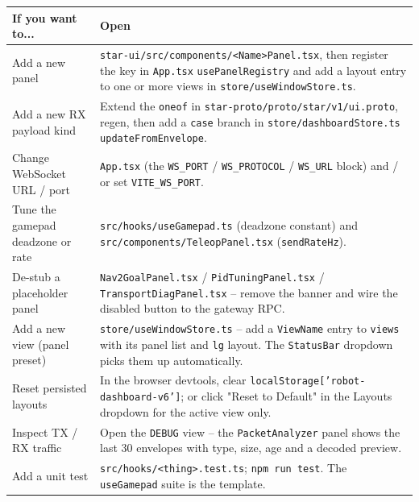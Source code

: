 \begin{center}
\begin{tabular}{|p{6.0cm}|p{8.7cm}|}
\hline
\textbf{If you want to...}                                  & \textbf{Open}                                                                                                       \\
\hline
Add a new panel                                              & \texttt{star-ui/src/components/<Name>Panel.tsx}, then register the key in \texttt{App.tsx} \texttt{usePanelRegistry} and add a layout entry to one or more views in \texttt{store/useWindowStore.ts}. \\
Add a new RX payload kind                                    & Extend the \texttt{oneof} in \texttt{star-proto/proto/star/v1/ui.proto}, regen, then add a \texttt{case} branch in \texttt{store/dashboardStore.ts} \texttt{updateFromEnvelope}. \\
Change WebSocket URL / port                                  & \texttt{App.tsx} (the \texttt{WS\_PORT} / \texttt{WS\_PROTOCOL} / \texttt{WS\_URL} block) and / or set \texttt{VITE\_WS\_PORT}. \\
Tune the gamepad deadzone or rate                            & \texttt{src/hooks/useGamepad.ts} (deadzone constant) and \texttt{src/components/TeleopPanel.tsx} (\texttt{sendRateHz}). \\
De-stub a placeholder panel                                  & \texttt{Nav2GoalPanel.tsx} / \texttt{PidTuningPanel.tsx} / \texttt{TransportDiagPanel.tsx} -- remove the banner and wire the disabled button to the gateway RPC. \\
Add a new view (panel preset)                                & \texttt{store/useWindowStore.ts} -- add a \texttt{ViewName} entry to \texttt{views} with its panel list and \texttt{lg} layout. The \texttt{StatusBar} dropdown picks them up automatically. \\
Reset persisted layouts                                      & In the browser devtools, clear \texttt{localStorage['robot-dashboard-v6']}; or click "Reset to Default" in the Layouts dropdown for the active view only. \\
Inspect TX / RX traffic                                      & Open the \texttt{DEBUG} view -- the \texttt{PacketAnalyzer} panel shows the last 30 envelopes with type, size, age and a decoded preview. \\
Add a unit test                                              & \texttt{src/hooks/<thing>.test.ts}; \texttt{npm run test}. The \texttt{useGamepad} suite is the template. \\
\hline
\end{tabular}
\end{center}
